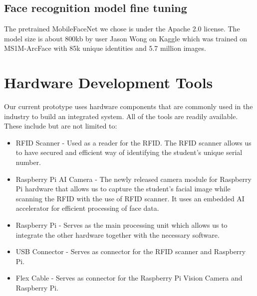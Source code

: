 \subsection{Face recognition model fine tuning}
The pretrained MobileFaceNet we chose is under the Apache 2.0 license. The model size is about 800kb by user Jason Wong on Kaggle which was trained on MS1M-ArcFace with 85k unique identities and 5.7 million images.

\section{Hardware Development Tools}
Our current prototype uses hardware components that are commonly used in the industry to build an integrated system. All of the tools are readily available. These include but are not limited to:

\begin{itemize}
	\item	RFID Scanner - Used as a reader for the RFID. The RFID scanner allows us to have secured and efficient way of identifying the student's unique serial number.
	
\end{itemize}

\begin{itemize}
	\item	Raspberry Pi AI Camera - The newly released camera module for Raspberry Pi hardware that allows us to capture the student's facial image while scanning the RFID with the use of RFID scanner. It uses an embedded AI accelerator for efficient processing of face data.
	
\end{itemize} 

\begin{itemize}
	\item	Raspberry Pi - Serves as the main processing unit which allows us to integrate the other hardware together with the necessary software.
	
\end{itemize}

\begin{itemize}
	\item	USB Connector -  Serves as connector for the RFID scanner and Raspberry Pi.
	
\end{itemize}

\begin{itemize}
	\item	Flex Cable -  Serves as connector for the Raspberry Pi Vision Camera and Raspberry Pi. 
	
\end{itemize}

